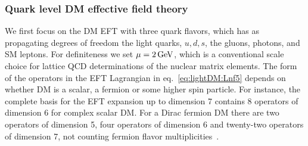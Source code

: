 \subsubsection*{Quark level DM effective field theory}  
We first focus on the DM EFT with three quark flavors, which has as propagating degrees of freedom the light quarks, $u,d,s$, the gluons, photons, and SM leptons. For definiteness we set $\mu=2\,{\rm GeV}$, which is a conventional scale choice for lattice QCD determinations of the nuclear matrix elements. 
The form of the operators in the EFT Lagrangian in eq.~\eqref{eq:lightDM:Lnf5} depends on whether DM is a scalar, a fermion or some higher spin particle. 
For instance, the complete basis for the EFT expansion up to dimension 7 contains 8 operators of dimension 6 for complex scalar DM. 
For a Dirac fermion DM there are two operators of dimension 5, four operators of dimension 6 and twenty-two operators of dimension 7, not counting fermion flavor multiplicities~\cite{Brod:2017bsw}. 

\smallskip

